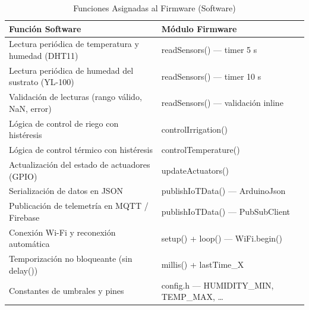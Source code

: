 \begin{table}[tp]
\centering
\renewcommand{\arraystretch}{1.3}
\caption{Funciones Asignadas al Firmware (Software)}
\label{tab:funciones_firmware}
\begin{tabularx}{\textwidth}{|X|X|}
\hline
\textbf{Función Software} & \textbf{Módulo Firmware} \\
\hline
Lectura periódica de temperatura y humedad (DHT11) & readSensors() --- timer 5 s \\
\hline
Lectura periódica de humedad del sustrato (YL-100) & readSensors() --- timer 10 s \\
\hline
Validación de lecturas (rango válido, NaN, error) & readSensors() --- validación inline \\
\hline
Lógica de control de riego con histéresis & controlIrrigation() \\
\hline
Lógica de control térmico con histéresis & controlTemperature() \\
\hline
Actualización del estado de actuadores (GPIO) & updateActuators() \\
\hline
Serialización de datos en JSON & publishIoTData() --- ArduinoJson \\
\hline
Publicación de telemetría en MQTT / Firebase & publishIoTData() --- PubSubClient \\
\hline
Conexión Wi-Fi y reconexión automática & setup() + loop() --- WiFi.begin() \\
\hline
Temporización no bloqueante (sin delay()) & millis() + lastTime\_X \\
\hline
Constantes de umbrales y pines & config.h --- HUMIDITY\_MIN, TEMP\_MAX, \ldots \\
\hline
\end{tabularx}
\end{table}